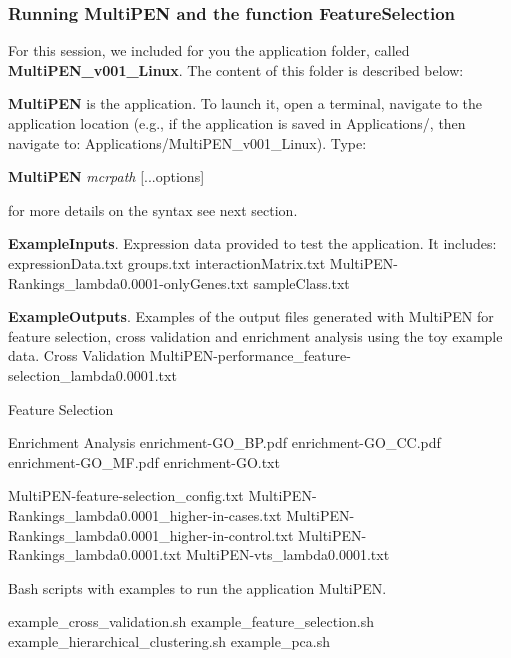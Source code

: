\documentclass[11pt, oneside]{article}   	%
\begin{document}
\subsubsection{Running MultiPEN and the function FeatureSelection}


For this session, we included for you the application folder, called {\bf MultiPEN\_v001\_Linux}. The content of this folder is described below:

\begin{outline}

   \1 {\bf MultiPEN} is the application. To launch it, open a terminal, navigate to the application location (e.g., if the application is saved in Applications/, then navigate to: Applications/MultiPEN\_v001\_Linux). Type:
   
   {\bf MultiPEN}    {\it mcrpath}   [...options] 
   
   for more details on the syntax see next section.

   \1 {\bf ExampleInputs}. Expression data provided to test the application. It includes:
      \2 expressionData.txt
      \2 groups.txt
      \2 interactionMatrix.txt
      \2 MultiPEN-Rankings\_lambda0.0001-onlyGenes.txt
      \2 sampleClass.txt
   
   \1 {\bf ExampleOutputs}. Examples of the output files generated with MultiPEN for feature selection, cross validation and enrichment analysis using the toy example data.
      \2 Cross Validation
         \3 MultiPEN-performance\_feature-selection\_lambda0.0001.txt
         
      \2 Feature Selection
      
      \2 Enrichment Analysis
         \3 enrichment-GO\_BP.pdf
         \3 enrichment-GO\_CC.pdf
         \3 enrichment-GO\_MF.pdf
         \3 enrichment-GO.txt
         
      \2 MultiPEN-feature-selection\_config.txt
         \3 MultiPEN-Rankings\_lambda0.0001\_higher-in-cases.txt
         \3 MultiPEN-Rankings\_lambda0.0001\_higher-in-control.txt
         \3 MultiPEN-Rankings\_lambda0.0001.txt
         \3 MultiPEN-vts\_lambda0.0001.txt
   
   \1 Bash scripts with examples to run the application MultiPEN.
   
      \2 example\_cross\_validation.sh
      \2 example\_feature\_selection.sh
      \2 example\_hierarchical\_clustering.sh
      \2 example\_pca.sh

\end{outline}
\end{document}
